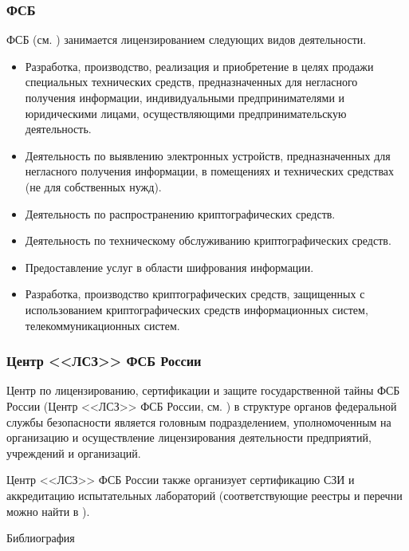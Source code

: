 \begin{frame}[allowframebreaks]
\frametitle{ФСБ}
ФСБ (см. \cite{bib:fsb}) занимается лицензированием следующих видов деятельности.
\begin{itemize}
    \item Разработка, производство, реализация и приобретение в целях продажи специальных технических средств, предназначенных для негласного получения информации, индивидуальными предпринимателями и юридическими лицами, осуществляющими предпринимательскую деятельность.
    \item Деятельность по выявлению электронных устройств, предназначенных для негласного получения информации, в помещениях и технических средствах (не для собственных нужд).
    \item Деятельность по распространению криптографических средств.
    \item Деятельность по техническому обслуживанию криптографических средств.
    \item Предоставление услуг в области шифрования информации.
    \item Разработка, производство криптографических средств, защищенных с использованием криптографических средств информационных систем, телекоммуникационных систем.
\end{itemize}
\end{frame}


\begin{frame}
\frametitle{Центр <<ЛСЗ>> ФСБ России}
Центр по лицензированию, сертификации и защите государственной тайны ФСБ России (Центр <<ЛСЗ>> ФСБ России, см. \cite{bib:clsz}) в структуре органов федеральной службы безопасности является головным подразделением, уполномоченным на организацию и осуществление лицензирования деятельности предприятий, учреждений и организаций.

Центр <<ЛСЗ>> ФСБ России также организует сертификацию СЗИ и аккредитацию испытательных лабораторий (соответствующие реестры и перечни можно найти в \cite{bib:fsb}). 
\end{frame}

\appendix

\begin{frame}[allowframebreaks]{Библиография}
    
    
\end{frame}


